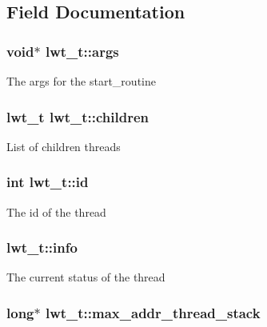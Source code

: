 \subsection{Field Documentation}
\hypertarget{structlwt_a6e870b21b996bc5c62b6cbd04328e784}{
\subsubsection[{args}]{\setlength{\rightskip}{0pt plus 5cm}void$\ast$ lwt\+\_\+t\+::args}}\label{structlwt_a6e870b21b996bc5c62b6cbd04328e784}
The args for the start\+\_\+routine \hypertarget{structlwt_a33d2fa8a95fe7c0deb7c7723bd4af344}{
\subsubsection[{children}]{\setlength{\rightskip}{0pt plus 5cm}lwt\+\_\+t lwt\+\_\+t\+::children}}\label{structlwt_a33d2fa8a95fe7c0deb7c7723bd4af344}
List of children threads \hypertarget{structlwt_aa3df3d76d606756e38bb9bd3d2c2d241}{
\subsubsection[{id}]{\setlength{\rightskip}{0pt plus 5cm}int lwt\+\_\+t\+::id}}\label{structlwt_aa3df3d76d606756e38bb9bd3d2c2d241}
The id of the thread \hypertarget{structlwt_a40641e751624b983f5e1ae5302210e5d}{
\subsubsection[{info}]{ lwt\+\_\+t\+::info}}\label{structlwt_a40641e751624b983f5e1ae5302210e5d}
The current status of the thread \hypertarget{structlwt_ae97cdce617ee026378588f57a999f972}{
\subsubsection[{max\+\_\+addr\+\_\+thread\+\_\+stack}]{\setlength{\rightskip}{0pt plus 5cm}long$\ast$ lwt\+\_\+t\+::max\+\_\+addr\+\_\+thread\+\_\+stack}}\label{structlwt_ae97cdce617ee026378588f57a999f972}

